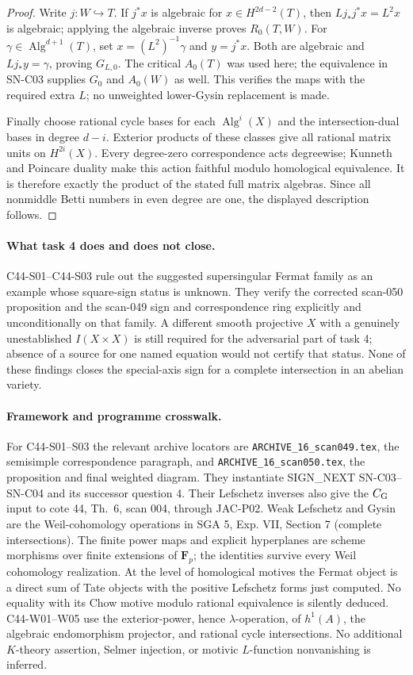 \begin{proof}
Write $j:W\hookrightarrow T$.  If $j^*x$ is algebraic
for $x\in H^{2d-2}(T)$, then
$L j_*j^*x=L^2x$ is algebraic; applying the algebraic
inverse proves $R_0(T,W)$.  For
$\gamma\in\operatorname{Alg}^{d+1}(T)$, set
$x=(L^2)^{-1}\gamma$ and $y=j^*x$.  Both are
algebraic and $Lj_*y=\gamma$, proving $G_{L,0}$.
The critical $A_0(T)$ was used here; the equivalence
in SN-C03 supplies $G_0$ and $A_0(W)$ as well.
This verifies the maps with the required extra $L$;
no unweighted lower-Gysin replacement is made.

Finally choose rational cycle bases for each
$\operatorname{Alg}^i(X)$ and the intersection-dual
bases in degree $d-i$.  Exterior products of these
classes give all rational matrix units on
$H^{2i}(X)$.  Every degree-zero correspondence
acts degreewise; Kunneth and Poincare duality make
this action faithful modulo homological equivalence.
It is therefore exactly the product of the stated
full matrix algebras.  Since all nonmiddle Betti
numbers in even degree are one, the displayed
description follows.
\end{proof}

\paragraph{What task 4 does and does not close.}
C44-S01--C44-S03 rule out the suggested supersingular Fermat
family as an example whose square-sign status is unknown.
They verify the corrected scan-050 proposition and the
scan-049 sign and correspondence ring explicitly and
unconditionally on that family.  A different smooth
projective $X$ with a genuinely unestablished $I(X\times X)$
is still required for the adversarial part of task 4; absence
of a source for one named equation would not certify that
status.  None of these findings closes the special-axis
sign for a complete intersection in an abelian variety.

\paragraph{Framework and programme crosswalk.}
For C44-S01--S03 the relevant archive locators are
\texttt{ARCHIVE\_16\_scan049.tex}, the semisimple
correspondence paragraph, and
\texttt{ARCHIVE\_16\_scan050.tex}, the proposition and
final weighted diagram.  They instantiate SIGN\_NEXT
SN-C03--SN-C04 and its successor question 4.  Their
Lefschetz inverses also give the $C_{\rm G}$ input to
cote 44, Th.~6, scan 004, through JAC-P02.  Weak
Lefschetz and Gysin are the Weil-cohomology operations
in SGA 5, Exp. VII, Section 7 (complete intersections).
The finite power maps and explicit hyperplanes are
scheme morphisms over finite extensions of $\mathbf F_p$;
the identities survive every Weil cohomology realization.
At the level of homological motives the Fermat object
is a direct sum of Tate objects with the positive
Lefschetz forms just computed.  No equality with its
Chow motive modulo rational equivalence is silently
deduced.  C44-W01--W05 use the exterior-power, hence
$\lambda$-operation, of $h^1(A)$, the algebraic
endomorphism projector, and rational cycle intersections.
No additional $K$-theory assertion, Selmer injection,
or motivic $L$-function nonvanishing is inferred.
